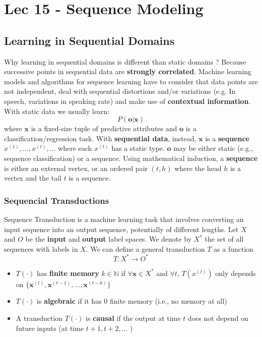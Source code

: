 \chapter{Lec 15 - Sequence Modeling}

\section{Learning in Sequential Domains}
Why learning in sequential domains is different than static domains ? Because successive points in sequential data are \textbf{strongly correlated}. Machine learning models and algorithms for sequence learning have to consider that data points are not independent, deal with sequential distortions and/or variations (e.g. In speech, variations in speaking rate) and make use of \textbf{contextual information}.
\newline\newline
With static data we usually learn:
\[P(\textbf{o}|\textbf{x})\]
where $\textbf{x}$ is a fixed-size tuple of predictive attributes and $\textbf{o}$ is a classification/regression task.\newline\newline
With \textbf{sequential data}, instead, $\textbf{x}$ is a \textbf{sequence} $x^{(1)}, ..., x^{(t)}, ...$ where each $x^{(t)}$ has a static type. $\textbf{o}$ may be either static (e.g., sequence classification) or a sequence.\newline\newline
Using mathematical induction, a \textbf{sequence} is either an external vertex, or an ordered pair $(t, h)$ where the head $h$ is a vertex and the tail $t$ is a sequence.

\subsection{Sequencial Transductions}
Sequence Transduction is a machine learning task that involves converting an input sequence into an output sequence, potentially of different lengths.\newline\newline
Let $X$ and $O$ be the \textbf{input} and \textbf{output} label spaces. We denote by $X^*$ the set of all sequences with labels in $X$. We can define a general transduction $T$ as a function
\[T : X^* \rightarrow O^*\]
\begin{itemize}
    \item $T(\cdot)$ has \textbf{finite memory} $k \in \mathbb{N}$ if $\forall \textbf{x} \in X^*$ and $\forall t$, $T(x^{(t)})$ only depends on $\{\textbf{x}^{(t)}, \textbf{x}^{(t-1)}, ..., \textbf{x}^{(t-k)}\}$ 

    \item $T(\cdot)$ is \textbf{algebraic} if it has 0 finite memory (i.e., no memory at all)

    \item A transduction $T(\cdot)$ is \textbf{causal} if the output at time $t$ does not depend on future inputs (at time $t + 1, t + 2,...$ )

\end{itemize}

